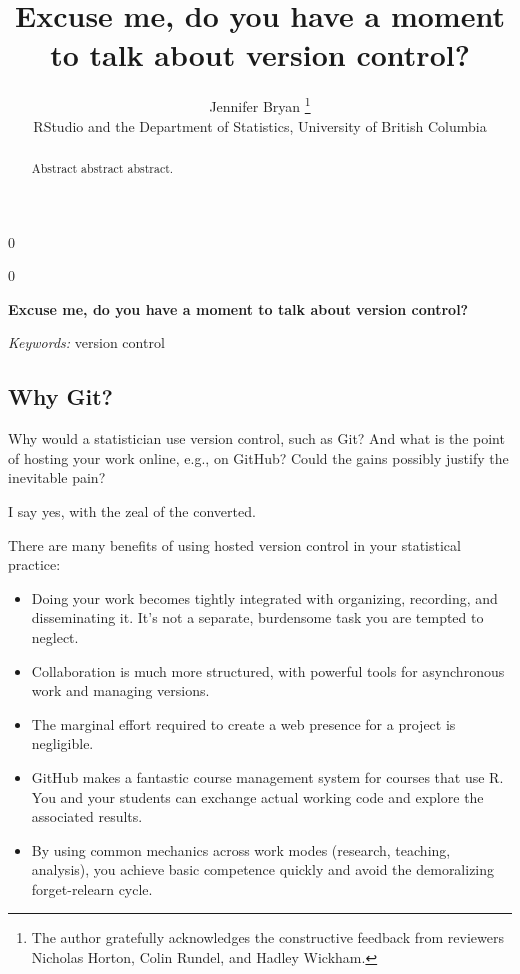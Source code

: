 \documentclass[12pt]{article}
\providecommand{\tightlist}{%
  \setlength{\itemsep}{0pt}\setlength{\parskip}{0pt}}
\newcommand{\blind}{0}
\begin{document}
\def\spacingset#1{\renewcommand{\baselinestretch}%
{#1}\small\normalsize} \spacingset{1}



\blind
{
  \title{\bf Excuse me, do you have a moment to talk about version control?}

  \author{
        Jennifer Bryan \thanks{The author gratefully acknowledges the constructive feedback from
reviewers Nicholas Horton, Colin Rundel, and Hadley Wickham.} \\
    RStudio and the Department of Statistics, University of British Columbia\\
      }
  \maketitle
} \fi

\blind
{
  \bigskip
  \bigskip
  \bigskip
  \begin{center}
    {\LARGE\bf Excuse me, do you have a moment to talk about version control?}
  \end{center}
  \medskip
} \fi

\bigskip
\begin{abstract}
Abstract abstract abstract.
\end{abstract}

\noindent%
{\it Keywords:} version control
\vfill

\newpage
\spacingset{1.45} %

\subsection{Why Git?}\label{why-git}

Why would a statistician use version control, such as Git? And what is
the point of hosting your work online, e.g., on GitHub? Could the gains
possibly justify the inevitable pain?

I say yes, with the zeal of the converted.

There are many benefits of using hosted version control in your
statistical practice:

\begin{itemize}
\tightlist
\item
  Doing your work becomes tightly integrated with organizing, recording,
  and disseminating it. It's not a separate, burdensome task you are
  tempted to neglect.
\item
  Collaboration is much more structured, with powerful tools for
  asynchronous work and managing versions.
\item
  The marginal effort required to create a web presence for a project is
  negligible.
\item
  GitHub makes a fantastic course management system for courses that use
  R. You and your students can exchange actual working code and explore
  the associated results.
\item
  By using common mechanics across work modes (research, teaching,
  analysis), you achieve basic competence quickly and avoid the
  demoralizing forget-relearn cycle.
\end{itemize}
\end{document}
